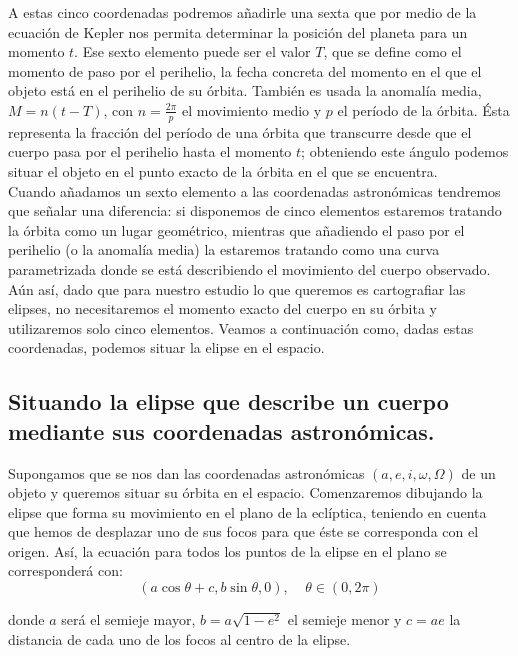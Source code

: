 \documentclass[11pt]{book}
\begin{document}
A estas cinco coordenadas podremos añadirle una sexta que por medio de la ecuación de Kepler nos permita determinar la posición del planeta para un momento $t$. Ese sexto elemento puede ser el valor $T$, que se define como el momento de paso por el perihelio, la fecha concreta del momento en el que el objeto está en el perihelio de su órbita. También es usada la anomalía media, $M=n(t-T)$, con $n=\frac{2\pi}{p}$ el movimiento medio y $p$ el período de la órbita. Ésta representa la fracción del período de una órbita que transcurre desde que el cuerpo pasa por el perihelio hasta el momento $t$; obteniendo este ángulo podemos situar el objeto en el punto exacto de la órbita en el que se encuentra.\\

Cuando añadamos un sexto elemento a las coordenadas astronómicas tendremos que señalar una diferencia: si disponemos de cinco elementos estaremos tratando la órbita como un lugar geométrico, mientras que añadiendo el paso por el perihelio (o la anomalía media) la estaremos tratando como una curva parametrizada donde se está describiendo el movimiento del cuerpo observado. Aún así, dado que para nuestro estudio lo que queremos es cartografiar las elipses, no necesitaremos el momento exacto del cuerpo en su órbita y utilizaremos solo cinco elementos. Veamos a continuación como, dadas estas coordenadas, podemos situar la elipse en el espacio.\\

\subsection{Situando la elipse que describe un cuerpo mediante sus coordenadas astronómicas.}
\label{subsec:set_ellipse_position}
Supongamos que se nos dan las coordenadas astronómicas $(a,e,i,\omega,\Omega)$ de un objeto y queremos situar su órbita en el espacio. Comenzaremos dibujando la elipse que forma su movimiento en el plano de la eclíptica, teniendo en cuenta que hemos de desplazar uno de sus focos para que éste se corresponda con el origen. Así, la ecuación para todos los puntos de la elipse en el plano se corresponderá con:
\[
(a\cos{\theta}+c, b\sin{\theta}, 0), \; \; \; \; \theta\in(0,2\pi)
\]

\noindent donde $a$ será el semieje mayor, $b=a\sqrt{1-e^2}$ el semieje menor y $c=ae$ la distancia de cada uno de los focos al centro de la elipse.\\
\end{document}
